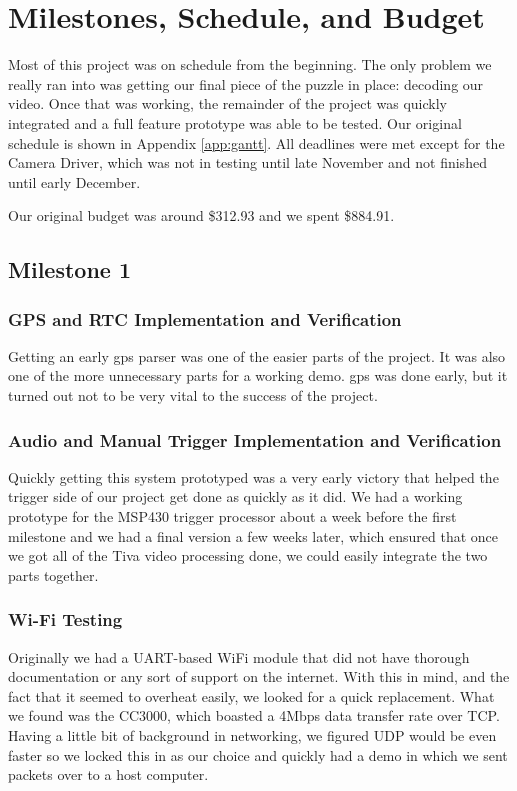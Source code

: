 \documentclass[12pt]{article}
\begin{document}
\section{Milestones, Schedule, and Budget}
Most of this project was on schedule from the beginning. The only problem we
really ran into was getting our final piece of the puzzle in place: decoding
our video. Once that was working, the remainder of the project was quickly
integrated and a full feature prototype was able to be tested. Our original
schedule is shown in Appendix \ref{app:gantt}. All deadlines were met except
for the Camera Driver, which was not in testing until late November and not
finished until early December.

Our original budget was around \$312.93 and we spent \$884.91.

\subsection{Milestone 1}
\subsubsection{GPS and RTC Implementation and Verification}
Getting an early \gls{gps} parser was one of the easier parts of the project.
It was also one of the more unnecessary parts for a working demo. \gls{gps} was
done early, but it turned out not to be very vital to the success of the
project.

\subsubsection{Audio and Manual Trigger Implementation and Verification}
Quickly getting this system prototyped was a very early victory that helped the
trigger side of our project get done as quickly as it did. We had a working
prototype for the MSP430 trigger processor about a week before the first
milestone and we had a final version a few weeks later, which ensured that once
we got all of the Tiva video processing done, we could easily integrate the two
parts together.

\subsubsection{Wi-Fi Testing}
Originally we had a UART-based WiFi module that did not have thorough
documentation or any sort of support on the internet. With this in mind, and
the fact that it seemed to overheat easily, we looked for a quick replacement.
What we found was the CC3000, which boasted a 4Mbps data transfer rate over
TCP.  Having a little bit of background in networking, we figured UDP would be
even faster so we locked this in as our choice and quickly had a demo in which
we sent packets over to a host computer.
\end{document}
